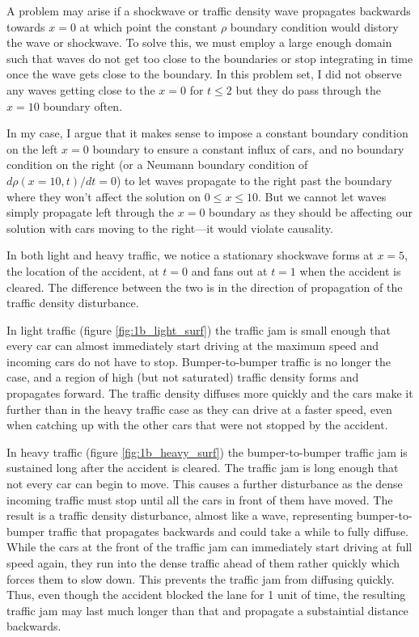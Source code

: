 \documentclass[11pt]{article}
\begin{document}
A problem may arise if a shockwave or traffic density wave propagates backwards towards $x=0$ at which point the constant $\rho$ boundary condition would distory the wave or shockwave. To solve this, we must employ a large enough domain such that waves do not get too close to the boundaries or stop integrating in time once the wave gets close to the boundary. In this problem set, I did not observe any waves getting close to the $x=0$ for $t \le 2$ but they do pass through the $x=10$ boundary often.

In my case, I argue that it makes sense to impose a constant boundary condition on the left $x=0$ boundary to ensure a constant influx of cars, and no boundary condition on the right (or a Neumann boundary condition of $d\rho(x=10,t)/dt=0$) to let waves propagate to the right past the boundary where they won't affect the solution on $0 \le x \le 10$. But we cannot let waves simply propagate left through the $x=0$ boundary as they should be affecting our solution with cars moving to the right---it would violate causality.

In both light and heavy traffic, we notice a stationary shockwave forms at $x=5$, the location of the accident, at $t=0$ and fans out at $t=1$ when the accident is cleared. The difference between the two is in the direction of propagation of the traffic density disturbance.

In light traffic (figure \ref{fig:1b_light_surf}) the traffic jam is small enough that every car can almost immediately start driving at the maximum speed and incoming cars do not have to stop. Bumper-to-bumper traffic is no longer the case, and a region of high (but not saturated) traffic density forms and propagates forward. The traffic density diffuses more quickly and the cars make it further than in the heavy traffic case as they can drive at a faster speed, even when catching up with the other cars that were not stopped by the accident.

In heavy traffic (figure \ref{fig:1b_heavy_surf}) the bumper-to-bumper traffic jam is sustained long after the accident is cleared. The traffic jam is long enough that not every car can begin to move. This causes a further disturbance as the dense incoming traffic must stop until all the cars in front of them have moved. The result is a traffic density disturbance, almost like a wave, representing bumper-to-bumper traffic that propagates backwards and could take a while to fully diffuse. While the cars at the front of the traffic jam can immediately start driving at full speed again, they run into the dense traffic ahead of them rather quickly which forces them to slow down. This prevents the traffic jam from diffusing quickly. Thus, even though the accident blocked the lane for 1 unit of time, the resulting traffic jam may last much longer than that and propagate a substaintial distance backwards.
\end{document}
